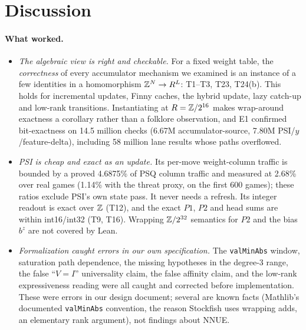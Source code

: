 \section{Discussion}\label{sec:discussion}

\paragraph{What worked.}
\begin{itemize}[leftmargin=*,itemsep=2pt]
\item \emph{The algebraic view is right and checkable.}
For a fixed weight table, the \emph{correctness} of every accumulator mechanism we examined is an instance of a few identities in a homomorphism $\mathbb{Z}^N\to R^L$: T1--T3, T23, T24(b).
This holds for incremental updates, Finny caches, the hybrid update, lazy catch-up and low-rank transitions.
Instantiating at $R=\mathbb{Z}/2^{16}$ makes wrap-around exactness a corollary rather than a folklore observation, and E1 confirmed bit-exactness on 14.5 million checks (6.67M accumulator-source, 7.80M PSI/$y$/feature-delta), including 58 million lane results whose paths overflowed.
\item \emph{PSI is cheap and exact as an update.}
Its per-move weight-column traffic is bounded by a proved 4.6875\% of PSQ column traffic and measured at 2.68\% over real games (1.14\% with the threat proxy, on the first 600 games); these ratios exclude PSI's own state pass.
It never needs a refresh.
Its integer readout is exact over $\mathbb{Z}$ (T12), and the exact $P1$, $P2$ and head sums are within int16/int32 (T9, T16).
Wrapping $\mathbb{Z}/2^{32}$ semantics for $P2$ and the bias $b^z$ are not covered by Lean.
\item \emph{Formalization caught errors in our own specification.}
The \texttt{valMinAbs} window, saturation path dependence, the missing hypotheses in the degree-3 range, the false ``$V=I$'' universality claim, the false affinity claim, and the low-rank expressiveness reading were all caught and corrected before implementation.
These were errors in our design document; several are known facts (Mathlib's documented \texttt{valMinAbs} convention, the reason Stockfish uses wrapping adds, an elementary rank argument), not findings about NNUE.
\end{itemize}

